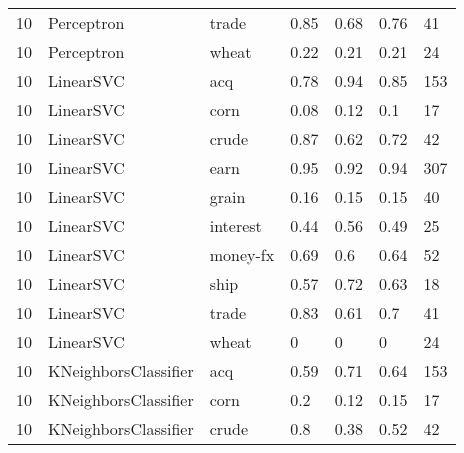 \documentclass{article}
\begin{document}
\begin{table}[h]
\begin{tabular}{lllllll}
10            & Perceptron             & trade           & 0.85               & 0.68            & 0.76              & 41               \\
10            & Perceptron             & wheat           & 0.22               & 0.21            & 0.21              & 24               \\
10            & LinearSVC              & acq             & 0.78               & 0.94            & 0.85              & 153              \\
10            & LinearSVC              & corn            & 0.08               & 0.12            & 0.1               & 17               \\
10            & LinearSVC              & crude           & 0.87               & 0.62            & 0.72              & 42               \\
10            & LinearSVC              & earn            & 0.95               & 0.92            & 0.94              & 307              \\
10            & LinearSVC              & grain           & 0.16               & 0.15            & 0.15              & 40               \\
10            & LinearSVC              & interest        & 0.44               & 0.56            & 0.49              & 25               \\
10            & LinearSVC              & money-fx        & 0.69               & 0.6             & 0.64              & 52               \\
10            & LinearSVC              & ship            & 0.57               & 0.72            & 0.63              & 18               \\
10            & LinearSVC              & trade           & 0.83               & 0.61            & 0.7               & 41               \\
10            & LinearSVC              & wheat           & 0                  & 0               & 0                 & 24               \\
10            & KNeighborsClassifier   & acq             & 0.59               & 0.71            & 0.64              & 153              \\
10            & KNeighborsClassifier   & corn            & 0.2                & 0.12            & 0.15              & 17               \\
10            & KNeighborsClassifier   & crude           & 0.8                & 0.38            & 0.52              & 42               \\

\end{tabular}
\end{table}
\end{document}
